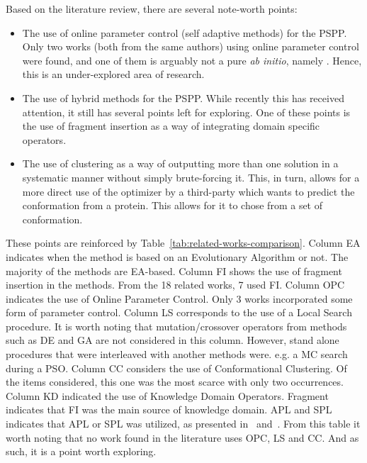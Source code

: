 Based on the literature review, there are several note-worth points:
\begin{itemize}
    \item The use of online parameter control (self adaptive methods) for the PSPP.
    Only two works (both from the same authors) using online parameter control
    were found, and one of them is arguably not a pure \textit{ab initio}, namely
    \cite{oliveira2017sade}.
    Hence, this is an under-explored area of research.
    \item The use of hybrid methods for the PSPP. While recently this has received
    attention, it still has several points left for exploring. One of these points
    is the use of fragment insertion as a way of integrating domain specific operators.
    \item The use of clustering as a way of outputting more than one solution in a
    systematic manner without simply brute-forcing it. This, in turn, allows for
    a more direct use of the optimizer by a third-party which wants to predict the
    conformation from a protein. This allows for it to chose from a set of conformation.
\end{itemize}

These points are reinforced by Table~\ref{tab:related-works-comparison}. Column
\ac{EA} indicates when the method is based on an Evolutionary Algorithm or not. The majority of the methods are EA-based. Column \ac{FI} shows the use of fragment insertion
in the methods. From the 18 related works, 7 used \ac{FI}. Column OPC indicates
the use of Online Parameter Control. Only 3 works incorporated some form of
parameter control. Column LS corresponds to the use of a Local Search procedure.
It is worth noting that mutation/crossover operators from methods such as \ac{DE}
and \ac{GA} are not considered in this column. However, stand alone procedures that
were interleaved with another methods were. e.g. a \ac{MC} search during a \ac{PSO}.
Column \ac{CC} considers the use of Conformational Clustering. Of the items considered,
this one was the most scarce with only two occurrences. Column KD indicated the use
of Knowledge Domain Operators. Fragment indicates that \ac{FI} was the main
source of knowledge domain. APL and SPL indicates that APL or SPL was utilized,
as presented in~\cite{borguesan2015apl} and~\cite{oliveira2017sade}. From this
table it worth noting that no work found in the literature uses OPC, LS and CC.
And as such, it is a point worth exploring.

